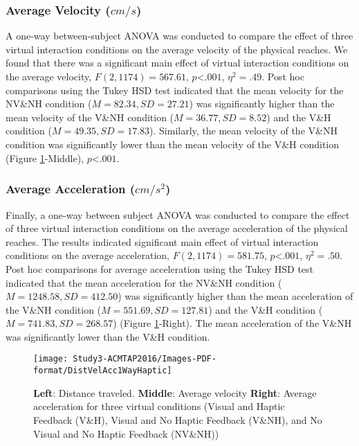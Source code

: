 \subsubsection{Average Velocity ($cm/s$)}
A one-way between-subject ANOVA was conducted to compare the effect of three virtual interaction conditions on the average velocity of the physical reaches. We found that there was a significant main effect of virtual interaction conditions on the average velocity, $F(2,1174)=567.61$, $p$\textless$.001$, $\eta^{2}=.49$. Post hoc comparisons using the Tukey HSD test indicated that the mean velocity for the NV\&NH condition ($M=82.34, SD=27.21$) was significantly higher than the mean velocity of the V\&NH condition ($M=36.77, SD=8.52$) and the V\&H condition ($M=49.35, SD=17.83$). Similarly, the mean velocity of the V\&NH condition was significantly lower than the mean velocity of the V\&H condition (Figure \ref{fig:DistSpeed}-Middle), $p$\textless$.001$.

\subsubsection{Average Acceleration ($cm/s^2$)}
Finally, a one-way between subject ANOVA was conducted to compare the effect of three virtual interaction conditions on the average acceleration of the physical reaches. The results indicated significant main effect of virtual interaction conditions on the average acceleration, $F(2,1174)=581.75$, $p$\textless$.001$, $\eta^{2}=.50$. Post hoc comparisons for average acceleration using the Tukey HSD test indicated that the mean acceleration for the NV\&NH condition ($M=1248.58, SD=412.50$) was significantly higher than the mean acceleration of the V\&NH condition ($M=551.69, SD=127.81$) and the V\&H condition ($M=741.83, SD=268.57$) (Figure \ref{fig:DistSpeed}-Right). The mean acceleration of the V\&NH was significantly lower than the V\&H condition. 

\begin{figure}[!htb]
	\centering
	\texttt{[image: Study3-ACMTAP2016/Images-PDF-format/DistVelAcc1WayHaptic]}
	\caption{\textbf{Left}: Distance traveled. \textbf{Middle}: Average velocity \textbf{Right}: Average acceleration for three virtual conditions (Visual and Haptic Feedback (V\&H), Visual and No Haptic Feedback (V\&NH), and No Visual and No Haptic Feedback (NV\&NH))}
	\label{fig:DistSpeed}	
\end{figure}




